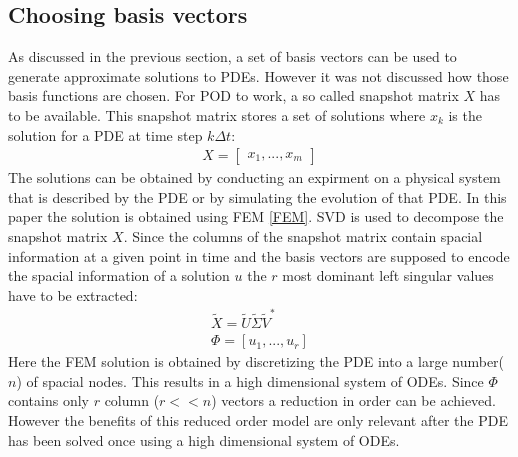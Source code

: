\subsection{Choosing basis vectors}
As discussed in the previous section, a set of basis vectors can be used to generate approximate solutions to PDEs.
However it was not discussed how those basis functions are chosen.
For POD to work, a so called snapshot matrix \(X\) has to be available.
This snapshot matrix stores a set of solutions where \(x_k\) is the solution for a PDE at time step \(k\Delta t\):
\begin{gather}
X = \begin{bmatrix}
x_1, ..., x_m
\end{bmatrix}
\end{gather}
The solutions can be obtained by conducting an expirment on a physical system that is described by the PDE or by simulating the evolution of that PDE.
In this paper the solution is obtained using FEM \ref{FEM}.
SVD is used to decompose the snapshot matrix \(X\).
Since the columns of the snapshot matrix contain spacial information at a given point in time and the basis vectors are supposed to encode the spacial information of a solution \(u\) the \(r\) most dominant left singular values have to be extracted:
\begin{gather}
\tilde{X} = \tilde{U}\tilde{\Sigma}\tilde{V}^{*} \\
\Phi = [u_1, ..., u_r] \label{PHI}
\end{gather}
Here the FEM solution is obtained by discretizing the PDE into a large number(\(n\)) of spacial nodes.
This results in a high dimensional system of ODEs.
Since \(\Phi\) contains only \(r\) column (\(r << n\)) vectors a reduction in order can be achieved.
However the benefits of this reduced order model are only relevant after the PDE has been solved once using a high dimensional system of ODEs.
\cite{brunton_kutz_2019c}
